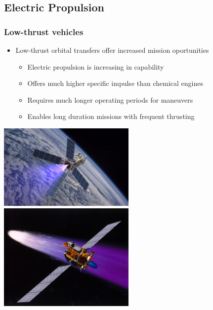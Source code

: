 \subsection[Electric Propulsion]{Electric Propulsion}  

\begin{frame} \label{slide:lowthrust_vehicles}%
\frametitle{Low-thrust vehicles} %
\begin{itemize}
    \item Low-thrust orbital transfers offer increased mission oportunities
    \begin{itemize}
        \item Electric propulsion is increasing in capability
        \item Offers much higher specific impulse than chemical engines 
        \item Requires much longer operating periods for maneuvers 
        \item Enables long duration missions with frequent thrusting
    \end{itemize}
\end{itemize}

\begin{center}
    \includegraphics[height=0.4\textheight,width=0.5\textwidth,keepaspectratio]{figures/defense/patriot_plume.jpg}
    ~
    \includegraphics[height=0.4\textheight,width=0.5\textwidth,keepaspectratio]{figures/defense/deepspace1.jpg}
\end{center}
\hyperlink{slide:propulsion}{}
\end{frame}   %

